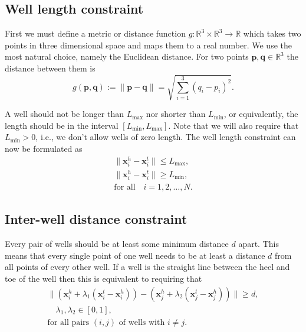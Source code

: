 \subsection{Well length constraint}
First we must define a metric or distance function
$g:\mathbb{R}^3 \times \mathbb{R}^3 \rightarrow \mathbb{R}$ 
which takes two points in three dimensional space and maps 
them to a real number. We use the most natural choice, namely
the Euclidean distance. For two points
$\textbf{p}, \textbf{q} \in \mathbb{R}^3$ the distance between
them is
%
\begin{equation}
 g(\textbf{p},\textbf{q}) := \| \textbf{p}-\textbf{q} \| = \sqrt{\sum_{i=1}^3 (q_i-p_i)^2}.
 \end{equation}

A well should not be longer than $L_{\max}$ nor shorter than $L_{\min}$, 
or equivalently, the length should be in the interval $[L_{\min},L_{\max}]$.
Note that we will also require that $L_{\min} > 0$, i.e., we don't allow
wells of zero length.  
The well length constraint can now be formulated as
%
\begin{align}
\| \textbf{x}_i^h - \textbf{x}_i^t \| \leq L_{\max}, \\
\| \textbf{x}_i^h - \textbf{x}_i^t \| \geq L_{\min}, \\
\text{for all} \quad i = 1,2,\dots,N. 
\end{align}

\subsection{Inter-well distance constraint}
Every pair of wells should be at least some minimum distance $d$ apart.
This means that every single point of one well needs to be at least a
distance $d$ from all points of every other well.
If a well is the straight line between the heel and toe of the well then
this is equivalent to requiring that
%
\begin{align}
\| (\textbf{x}_i^h + \lambda_1 (\textbf{x}_i^t - \textbf{x}_i^h  )) - (\textbf{x}_j^h + \lambda_2 (\textbf{x}_j^t - \textbf{x}_j^h)) \| \geq d,\\
\quad \lambda_1, \lambda_2 \in [0,1], \\
\text{for all pairs } (i,j) \text{ of wells with } i \neq j.
\end{align}
%
%
